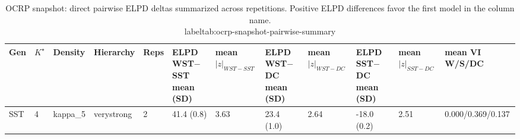 \begin{table}[!h]
\centering
\caption{OCRP snapshot: direct pairwise ELPD deltas summarized across repetitions. Positive ELPD differences favor the first model in the column name.\\label{tab:ocrp-snapshot-pairwise-summary}}
\centering
\begin{tabular}[t]{llllllllllll}
\toprule
Gen & $K^\star$ & Density & Hierarchy & Reps & ELPD WST$-$SST mean (SD) & mean $|z|_{WST-SST}$ & ELPD WST$-$DC mean (SD) & mean $|z|_{WST-DC}$ & ELPD SST$-$DC mean (SD) & mean $|z|_{SST-DC}$ & mean VI W/S/DC\\
\midrule
SST & 4 & kappa_5 & verystrong & 2 & 41.4 (0.8) & 3.63 & 23.4 (1.0) & 2.64 & -18.0 (0.2) & 2.51 & 0.000/0.369/0.137\\
\bottomrule
\end{tabular}
\end{table}
